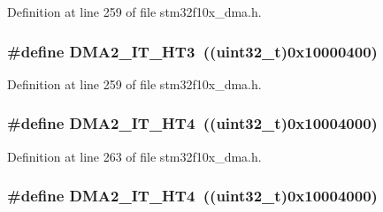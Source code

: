 Definition at line 259 of file stm32f10x\+\_\+dma.\+h.

\subsubsection[{\texorpdfstring{D\+M\+A2\+\_\+\+I\+T\+\_\+\+H\+T3}{DMA2_IT_HT3}}]{\setlength{\rightskip}{0pt plus 5cm}\#define D\+M\+A2\+\_\+\+I\+T\+\_\+\+H\+T3~(({\bf uint32\+\_\+t})0x10000400)}\hypertarget{group___d_m_a__interrupts__definition_gab3c0d024e03f9fdca539710c7e528904}{}\label{group___d_m_a__interrupts__definition_gab3c0d024e03f9fdca539710c7e528904}


Definition at line 259 of file stm32f10x\+\_\+dma.\+h.

\subsubsection[{\texorpdfstring{D\+M\+A2\+\_\+\+I\+T\+\_\+\+H\+T4}{DMA2_IT_HT4}}]{\setlength{\rightskip}{0pt plus 5cm}\#define D\+M\+A2\+\_\+\+I\+T\+\_\+\+H\+T4~(({\bf uint32\+\_\+t})0x10004000)}\hypertarget{group___d_m_a__interrupts__definition_ga4aa775a2f1e10783bd43911ad65bb28b}{}\label{group___d_m_a__interrupts__definition_ga4aa775a2f1e10783bd43911ad65bb28b}


Definition at line 263 of file stm32f10x\+\_\+dma.\+h.

\subsubsection[{\texorpdfstring{D\+M\+A2\+\_\+\+I\+T\+\_\+\+H\+T4}{DMA2_IT_HT4}}]{\setlength{\rightskip}{0pt plus 5cm}\#define D\+M\+A2\+\_\+\+I\+T\+\_\+\+H\+T4~(({\bf uint32\+\_\+t})0x10004000)}\hypertarget{group___d_m_a__interrupts__definition_ga4aa775a2f1e10783bd43911ad65bb28b}{}\label{group___d_m_a__interrupts__definition_ga4aa775a2f1e10783bd43911ad65bb28b}



